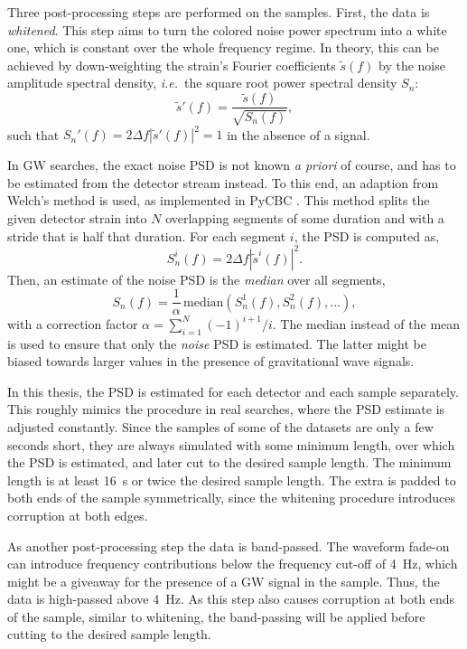 Three post-processing steps are performed on the samples.
First, the data is \emph{whitened}. This step aims to turn the colored noise power spectrum into a white one, which is constant over the whole frequency regime. In theory, this can be achieved by down-weighting the strain's Fourier coefficients $\tilde{s}(f)$ by the noise amplitude spectral density, \emph{i.e.}\ the square root power spectral density $S_n$: 
\begin{equation}
	\tilde{s}'(f) = \frac{\tilde{s}(f)}{\sqrt{S_n(f)}}, 
\end{equation}
such that $S_n'(f) = 2\Delta f|\tilde{s}'(f)|^2 = 1$ in the absence of a signal.

In GW searches, the exact noise PSD is not known \emph{a priori} of course, and has to be estimated from the detector stream instead. To this end, an adaption from Welch's method is used, as implemented in PyCBC \cite{alex_nitz_2023_10013996}. This method splits the given detector strain into $N$ overlapping segments of some duration and with a stride that is half that duration. For each segment $i$, the PSD is computed as,
\begin{equation}
	S_n^i(f) = 2\Delta f|\tilde{s}^i(f)|^2.
\end{equation}
Then, an estimate of the noise PSD is the \emph{median} over all segments,
 \begin{equation}
 	S_n(f) = \frac{1}{\alpha}\,\text{median}(S_n^1(f), S_n^2(f), \dots), 
 \end{equation}
with a correction factor $\alpha = \sum_{i=1}^N (-1)^{i+1}/i$. The median instead of the mean is used to ensure that only the \emph{noise} PSD is estimated. The latter might be biased towards larger values in the presence of gravitational wave signals. 

In this thesis, the PSD is estimated for each detector and each sample separately.
This roughly mimics the procedure in real searches, where the PSD estimate is adjusted constantly.
Since the samples of some of the datasets are only a few seconds short, they are always simulated with some minimum length, over which the PSD is estimated, and later cut to the desired sample length. The minimum length is at least \SI{16}{\second} or twice the desired sample length. The extra is padded to both ends of the sample symmetrically, since the whitening procedure introduces corruption at both edges.

As another post-processing step the data is band-passed. The waveform fade-on can introduce frequency contributions below the frequency cut-off of \SI{4}{\hertz}, which might be a giveaway for the presence of a GW signal in the sample. Thus, the data is high-passed above \SI{4}{\hertz}. As this step also causes corruption at both ends of the sample, similar to whitening, the band-passing will be applied before cutting to the desired sample length.

